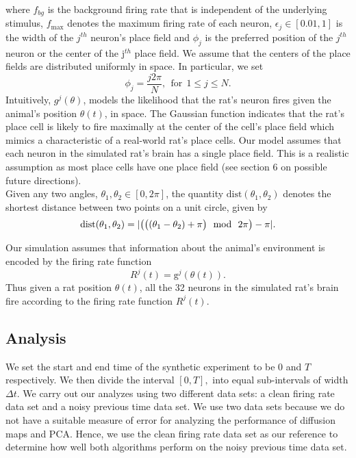 where $f_{bg}$ is the background firing rate that is independent of the underlying stimulus, $f_{\max}$ denotes the maximum firing rate of each neuron, $\epsilon_j \in  [0.01, 1]$ is the width of the $j^{th}$ neuron's place field  and $\phi_{j}$ is the preferred position of the $j^{th}$  neuron or the center of the j$^{th}$ place field. We assume that the centers of the place fields are distributed uniformly in space.  In particular, we set 
$$\phi_j = \frac{j2\pi}{N}, \ \    \text{for}   \ \    1 \leq j \leq N.$$
Intuitively, $g^{j}(\theta)$, models  the likelihood that the rat's neuron fires given the animal's position $\theta(t)$, in space.
The Gaussian function indicates that the rat's place cell is  likely to fire maximally  at the center of the cell's place field
which mimics a characteristic  of a real-world rat's place cells.
Our model assumes that each neuron in the simulated rat's brain has a single place field. This is a realistic assumption as 
most place cells have one place field (see section 6 on possible future directions). \\

Given any two angles, $\theta_{1}, \theta_{2} \in [0, 2\pi]$, the quantity
$\text{dist}(\theta_{1}, \theta_{2})$ denotes the shortest distance between 
two points on a unit circle, given by
\[
\text{dist}(\theta_{1}, \theta_{2}) = \abs{\big( \big( (\theta_{1} - \theta_{2}) + \pi  \big) \ \ \text{mod} \ \ 2\pi \big) - \pi}.
\]

Our simulation assumes  that information about the animal's environment is  encoded by the firing rate function
$$R^{j}(t) =  \text{g}^{j}(\theta(t)).$$
Thus given a rat position $\theta(t)$, all the 32  neurons  in the simulated rat's brain fire according to the firing rate function  $R^{j}(t).$


\subsection{Analysis}
We set the start  and end time of the synthetic experiment  to be  $0$ and $T$ respectively. We then divide the interval
$[0, T],$ into equal sub-intervals  of width $\Delta t$.
We carry out  our analyzes  using two different data sets:  a clean firing rate data set and  a noisy previous time data set.
We use two data sets because we do not have a suitable measure of error for analyzing the performance of diffusion maps
and PCA. Hence, we use the clean firing rate data set as our reference to determine how well both algorithms perform
on the noisy previous time data set.\\

